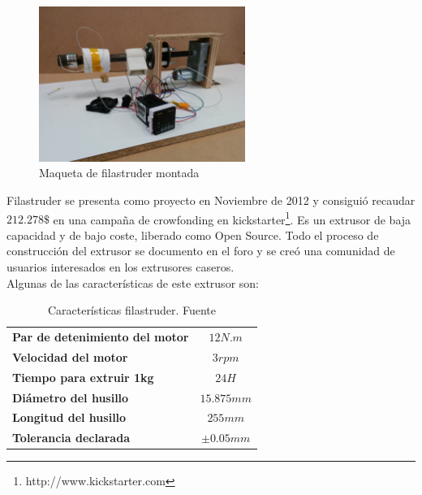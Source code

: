 	\begin{figure}[H]
            \centering
            \includegraphics[width=0.6\textwidth]{images/filaextruder/IMG_20150313_111634.jpg}
            \caption{Maqueta de filastruder montada}
            \label{fig:hardware_filastruder}
    \end{figure}

Filastruder se presenta como proyecto en Noviembre de 2012 \cite{filastruder} y consiguió recaudar $212.278 \$$ en una campaña de crowfonding en kickstarter\footnote{http://www.kickstarter.com}. Es un extrusor de baja capacidad y de bajo coste, liberado como Open Source. Todo el proceso de construcción del extrusor se documento en el foro y se creó una comunidad de usuarios interesados en los extrusores caseros.\\

Algunas de las características de este extrusor son:

\begin{table}[H]
\centering

\begin{tabular}{lc}
\textbf{Par de detenimiento del motor}            & $12N.m$                           \\
\textbf{Velocidad del motor}                      & $3 rpm$                           \\
\textbf{Tiempo para extruir 1kg}                  & $24H$                             \\
\textbf{Diámetro del husillo}                     & $15.875mm$                        \\
\textbf{Longitud del husillo}					  & $255mm$           				  \\
\textbf{Tolerancia declarada}					  & $\pm 0.05 mm$					  \\	

\end{tabular}
\caption{Características filastruder. Fuente\cite{tfg_diego}}
\label{tab:caract_filas}
\end{table}

